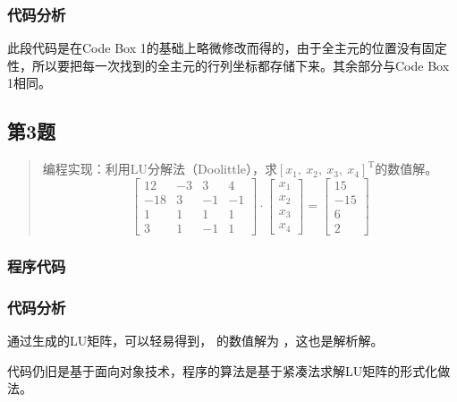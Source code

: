 \documentclass[UTF8, a4paper, zihao=-4, bibliography=totoc]{ctexart}
\begin{document}
\subsubsection{代码分析}
此段代码是在Code Box 1的基础上略微修改而得的，由于全主元的位置没有固定性，所以要把每一次找到的全主元的行列坐标都存储下来。其余部分与Code Box 1相同。

\subsection{第3题}
\begin{quote}
    {\kaishu
        编程实现：利用LU分解法（Doolittle），求$[x_1,\ x_2,\ x_3,\ x_4]^\mathrm{T}$的数值解。
    }
    \begin{equation}
        \left[ \begin{array}{rrrr}
            {12} & {-3} & {3} & {4} \\ {-18} & {3} & {-1} & {-1} \\ {1} & {1} & {1} & {1} \\ {3} & {1} & {-1} & {1}
        \end{array}\right] \cdot \left[ \begin{array}{c}{x_{1}} \\ {x_{2}} \\ {x_{3}} \\ {x_{4}}\end{array}\right]=\left[ \begin{array}{r}{15} \\ {-15} \\ {6} \\ {2}\end{array}\right]
    \end{equation}
\end{quote}

\subsubsection{程序代码}


\subsubsection{代码分析}

通过生成的LU矩阵，可以轻易得到， 的数值解为 ，这也是解析解。

代码仍旧是基于面向对象技术，程序的算法是基于紧凑法求解LU矩阵的形式化做法。
\end{document}
